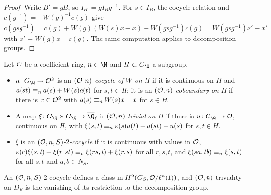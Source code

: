 \begin{proof}
Write $B'=gB$, so $I_{B'}=gI_Bg^{-1}$. For $s\in I_B$, the cocycle relation and $c(g^{-1})=-W(g)^{-1}c(g)$ give
$c(gsg^{-1})=c(g)+W(g)(W(s)x-x)-W(gsg^{-1})c(g)=W(gsg^{-1})x'-x'$ with $x'=W(g)x-c(g)$. The same computation applies to
decomposition groups.
\end{proof}

\begin{definition}\label{pf:kato:def:congr}
Let $\mathcal{O}$ be a coefficient ring, $n\in\N$ and $H\subset G_\Q$ a subgroup.
\begin{itemize}
\item $a\colon G_\Q\to\katoO^2$ is an \emph{$(\mathcal{O},n)$-cocycle of $W$ on $H$} if it is continuous on $H$ and
  $a(st)\equiv_{n}a(s)+W(s)a(t)$ for $s,t\in H$; it is an \emph{$(\mathcal{O},n)$-coboundary on $H$} if there is
  $x\in\mathcal{O}^2$ with $a(s)\equiv_{n}W(s)x-x$ for $s\in H$.
\item A map $\xi\colon G_\Q\times G_\Q\to\katoQlb$ is \emph{$(\mathcal{O},n)$-trivial on $H$} if there is $u\colon
  G_\Q\to\katoO$, continuous on $H$, with $\xi(s,t)\equiv_{n}\varepsilon(s)u(t)-u(st)+u(s)$ for $s,t\in H$.
\item $\xi$ is an \emph{$(\mathcal{O},n,S)$-$2$-cocycle} if it is continuous with values in $\mathcal{O}$,
  $\varepsilon(r)\xi(s,t)+\xi(r,st)\equiv_{n}\xi(rs,t)+\xi(r,s)$ for all $r,s,t$, and $\xi(sa,tb)\equiv_{n}\xi(s,t)$ for
  all $s,t$ and $a,b\in N_S$.
\end{itemize}
\end{definition}

An $(\mathcal{O},n,S)$-$2$-cocycle defines a class in $H^2(G_S,\mathcal{O}/\ell^n(1))$, and $(\mathcal{O},n)$-triviality on $D_B$ is the
vanishing of its restriction to the decomposition group.

